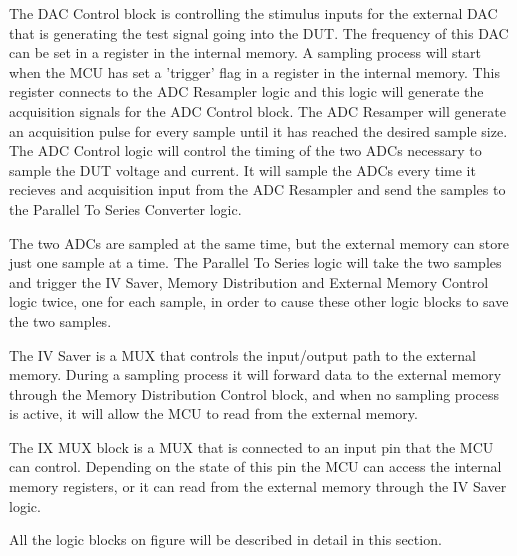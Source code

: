 The DAC Control block is controlling the stimulus inputs for the external DAC that is generating the test signal going into the DUT. The frequency of this DAC can be set in a register in the internal memory. A sampling process will start when the MCU has set a 'trigger' flag in a register in the internal memory. This register connects to the ADC Resampler logic and this logic will generate the acquisition signals for the ADC Control block. The ADC Resamper will generate an acquisition pulse for every sample until it has reached the desired sample size. The ADC Control logic will control the timing of the two ADCs necessary to sample the DUT voltage and current. It will sample the ADCs every time it recieves and acquisition input from the ADC Resampler and send the samples to the Parallel To Series Converter logic.

The two ADCs are sampled at the same time, but the external memory can store just one sample at a time. The Parallel To Series logic will take the two samples and trigger the IV Saver, Memory Distribution and External Memory Control logic twice, one for each sample, in order to cause these other logic blocks to save the two samples.

The IV Saver is a MUX that controls the input/output path to the external memory. During a sampling process it will forward data to the external memory through the Memory Distribution Control block, and when no sampling process is active, it will allow the MCU to read from the external memory.

The IX MUX block is a MUX that is connected to an input pin that the MCU can control. Depending on the state of this pin the MCU can access the internal memory registers, or it can read from the external memory through the IV Saver logic.

All the logic blocks on figure  will be described in detail in this section.